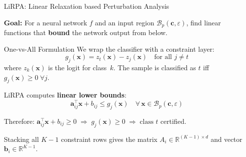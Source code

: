 \documentclass[aspectratio=169, 10pt]{beamer}
\newcommand{\vx}{\mathbf{x}}
\newcommand{\va}{\mathbf{a}}
\newcommand{\vb}{\mathbf{b}}
\newcommand{\vc}{\mathbf{c}}
\newcommand{\R}{\mathbb{R}}
\newcommand{\Bp}{\mathcal{B}_p}
\begin{document}
\begin{frame}{LiRPA: Linear Relaxation based Perturbation Analysis}

\textbf{Goal:} For a neural network $f$ and an input region $\Bp(\vc, \varepsilon)$, find linear functions that \textbf{bound} the network output from below.

\bigskip

\begin{block}{One-vs-All Formulation}
We wrap the classifier with a constraint layer:
\[
  g_j(\vx) = z_t(\vx) - z_j(\vx) \quad \text{for all } j \neq t
\]
where $z_k(\vx)$ is the logit for class~$k$. The sample is classified as $t$ iff $g_j(\vx) \geq 0\;\forall j$.

\medskip

LiRPA computes \textbf{linear lower bounds}:
\[
  \va_{ij}^\top \vx + b_{ij} \leq g_j(\vx) \quad \forall\, \vx \in \Bp(\vc, \varepsilon)
\]

Therefore: $\va_{ij}^\top \vx + b_{ij} \geq 0 \;\Longrightarrow\; g_j(\vx) \geq 0 \;\Longrightarrow\; \text{class } t$ certified.
\end{block}

\bigskip

Stacking all $K{-}1$ constraint rows gives the matrix $A_i \in \R^{(K-1) \times d}$ and vector $\vb_i \in \R^{K-1}$.

\end{frame}
\end{document}
